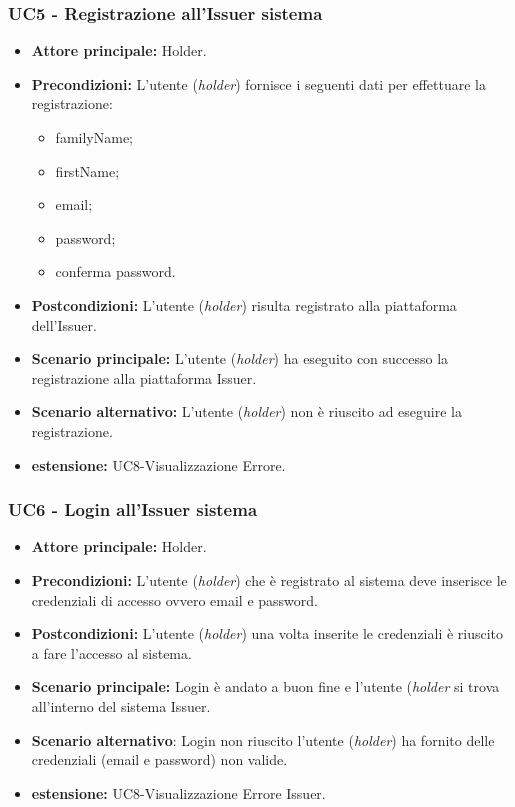 \subsubsection{UC5 - Registrazione all'Issuer sistema}
\begin{itemize}
\item \textbf{Attore principale:} Holder.
\item \textbf{Precondizioni:} L’utente (\textit{holder}) fornisce i seguenti dati per effettuare la registrazione:
\begin{itemize}
    \item familyName;
    \item firstName;
    \item email;
    \item password;
    \item conferma password.
\end{itemize}
\item \textbf{Postcondizioni:} L’utente (\textit{holder}) risulta registrato alla piattaforma dell'Issuer.
\item \textbf{Scenario principale:} L'utente (\textit{holder}) ha eseguito con successo la registrazione alla piattaforma Issuer.
\item \textbf{Scenario alternativo:} L'utente (\textit{holder}) non è riuscito ad eseguire la registrazione.
\item \textbf{estensione:} UC8-Visualizzazione Errore.
\end{itemize}

\subsubsection{UC6 - Login all'Issuer sistema}
\begin{itemize}
\item \textbf{Attore principale:} Holder.
\item \textbf{Precondizioni:} L'utente (\textit{holder}) che è registrato al sistema deve inserisce le credenziali di accesso ovvero email e password.
\item \textbf{Postcondizioni:} L'utente (\textit{holder}) una volta inserite le credenziali è riuscito a fare l'accesso al sistema.
\item \textbf{Scenario principale:} Login è andato a buon fine e l'utente  (\textit{holder} si trova all'interno del sistema Issuer.
\item \textbf{Scenario alternativo}: Login non riuscito l'utente (\textit{holder}) ha fornito delle credenziali (email e password) non valide.
\item \textbf{estensione:} UC8-Visualizzazione Errore Issuer.
\end{itemize}

